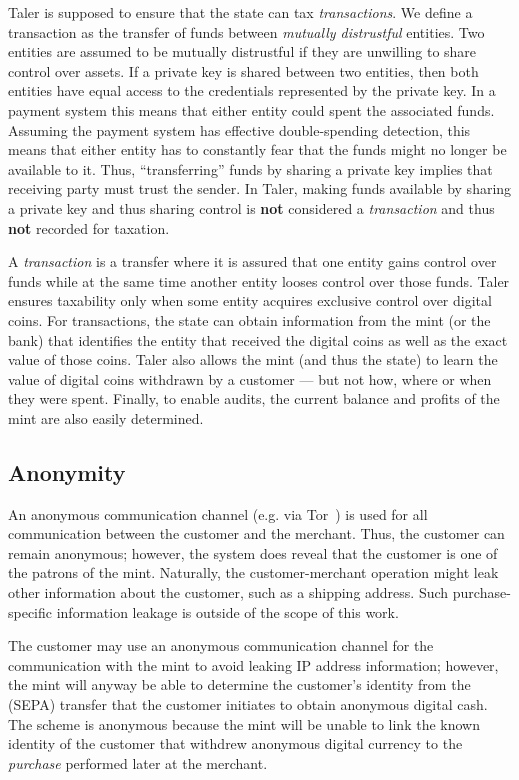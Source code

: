 \documentclass{llncs}
\begin{document}
Taler is supposed to ensure that the state can tax {\em transactions}.
We define a transaction as the transfer of funds between {\em mutually
  distrustful} entities.  Two entities are assumed to be mutually
distrustful if they are unwilling to share control over assets.  If a
private key is shared between two entities, then both entities have
equal access to the credentials represented by the private key.  In a
payment system this means that either entity could spent the
associated funds.  Assuming the payment system has effective
double-spending detection, this means that either entity has to
constantly fear that the funds might no longer be available to it.
Thus, ``transferring'' funds by sharing a private key implies that
receiving party must trust the sender.  In Taler, making funds
available by sharing a private key and thus sharing control is {\bf
  not} considered a {\em transaction} and thus {\bf not} recorded for
taxation.

A {\em transaction} is a transfer where it is assured that one entity
gains control over funds while at the same time another entity looses
control over those funds.  Taler ensures taxability only when some
entity acquires exclusive control over digital coins.  For
transactions, the state can obtain information from the mint (or the
bank) that identifies the entity that received the digital coins as
well as the exact value of those coins.  Taler also allows the mint
(and thus the state) to learn the value of digital coins withdrawn by
a customer --- but not how, where or when they were spent.  Finally,
to enable audits, the current balance and profits of the mint are also
easily determined.

\subsection{Anonymity}

An anonymous communication channel (e.g. via Tor~\cite{tor-design}) is
used for all communication between the customer and the merchant.
Thus, the customer can remain anonymous; however, the system does reveal
that the customer is one of the patrons of the mint.  Naturally, the
customer-merchant operation might leak other information about the
customer, such as a shipping address.  Such purchase-specific
information leakage is outside of the scope of this work.

The customer may use an anonymous communication channel for the
communication with the mint to avoid leaking IP address information;
however, the mint will anyway be able to determine the customer's
identity from the (SEPA) transfer that the customer initiates to
obtain anonymous digital cash.  The scheme is anonymous
because the mint will be unable to link the known identity of the
customer that withdrew anonymous digital currency to the {\em
  purchase} performed later at the merchant.
\end{document}
